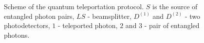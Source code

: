 \begin{figure}
\centering


\caption{Scheme of the quantum teleportation protocol. $S$ is the source of entangled photon pairs, $LS$ - beamsplitter, $D^{(1)}$ and $D^{(2)}$ - two photodetectors, $1$ - teleported photon, $2$ and $3$ - pair of entangled photons.}
\label{figTeleport}
\end{figure}